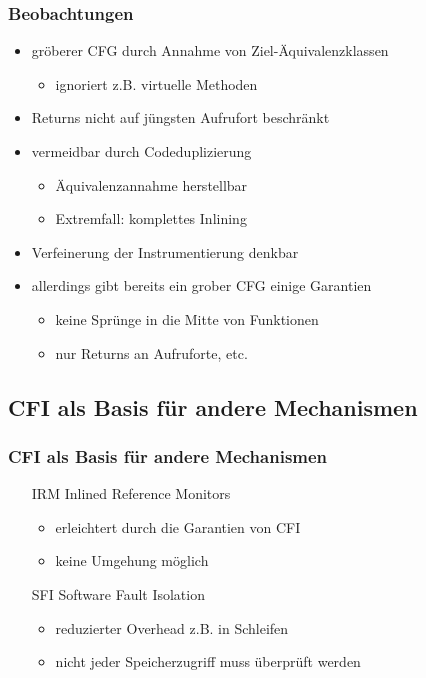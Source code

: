 \documentclass[mathserif,slidestop,compress,red]{beamer}
\begin{document}
\begin{frame}
  \frametitle{Beobachtungen}
  \begin{itemize}
    \item gröberer CFG durch Annahme von Ziel-Äquivalenzklassen
    \begin{itemize}
      \item ignoriert z.B. virtuelle Methoden
    \end{itemize}
    \item Returns nicht auf jüngsten Aufrufort beschränkt
    \pause
    \vspace{1em}
    \item vermeidbar durch Codeduplizierung
    \begin{itemize}
      \item Äquivalenzannahme herstellbar
      \item Extremfall: komplettes Inlining
    \end{itemize}
    \item Verfeinerung der Instrumentierung denkbar
    \pause
    \vspace{1em}
    \item allerdings gibt bereits ein grober CFG einige Garantien
    \begin{itemize}
      \item keine Sprünge in die Mitte von Funktionen
      \item nur Returns an Aufruforte, etc.
    \end{itemize}
  \end{itemize}
\end{frame}

\subsection{CFI als Basis für andere Mechanismen}

\begin{frame}
  \frametitle{CFI als Basis für andere Mechanismen}
  \begin{itemize}
    \item [IRM] Inlined Reference Monitors
    \begin{itemize}
      \item erleichtert durch die Garantien von CFI
      \item keine Umgehung möglich
    \end{itemize}
    \item [SFI] Software Fault Isolation
    \begin{itemize}
      \item reduzierter Overhead z.B. in Schleifen
      \item nicht jeder Speicherzugriff muss überprüft werden
    \end{itemize}
  \end{itemize}
\end{frame}
\end{document}
